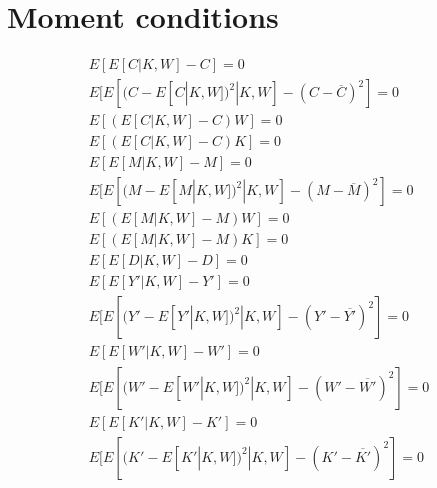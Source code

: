 \documentclass[12pt, fleqn]{article}
\begin{document}
\clearpage

%
%

\appendix
\section{Moment conditions}
\begin{align*}
    E[E[C|K, W] - C]                                      =  0 \\
    E[E[(C - E[C|K, W])^2 | K, W] -  (C - \overline{C})^2]     =  0 \\
    E[(E[C|K, W] - C)W]                                   =  0 \\
    E[(E[C|K, W] - C)K]                                   =  0 \\
    E[E[M|K, W] - M]                                      =  0 \\
    E[E[(M - E[M|K, W])^2 | K, W] -  (M - \overline{M})^2]     =  0 \\
    E[(E[M|K, W] - M)W]                                   =  0 \\
    E[(E[M|K, W] - M)K]                                   =  0 \\
    E[E[D|K, W] - D]                                      =  0 \\
    E[E[Y'|K, W] - Y']                                    =  0 \\
    E[E[(Y' - E[Y'|K, W])^2 | K, W] -  (Y' - \overline{Y'})^2] =  0 \\
    E[E[W'|K, W] - W']                                    =  0 \\
    E[E[(W' - E[W'|K, W])^2 | K, W] -  (W' - \overline{W'})^2] =  0 \\
    E[E[K'|K, W] - K']                                    =  0 \\
    E[E[(K' - E[K'|K, W])^2 | K, W] -  (K' - \overline{K'})^2] =  0 
\end{align*}
\end{document}
